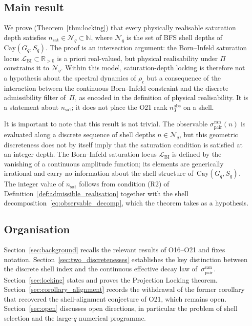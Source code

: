 \documentclass[12pt,a4paper]{article}
\theoremstyle{remark}
\newcommand{\sigpair}{\sigma^{\mathrm{can}}_{\mathrm{pair}}}
\newcommand{\nsat}{n_{\mathrm{sat}}}
\newcommand{\nobs}{n^{\mathrm{obs}}_3}
\newcommand{\Cay}{\mathrm{Cay}(G_q, S_q)}
\begin{document}
  \subsection{Main result}
    \label{subsec:main_result}

    We prove (Theorem~\ref{thm:locking}) that every physically realisable saturation depth
    satisfies $\nsat \in \mathcal{N}_q \subset \mathbb{N}$, where $\mathcal{N}_q$ is the set
    of BFS shell depths of $\Cay$.
    The proof is an intersection argument: the Born--Infeld saturation locus
    $\mathcal{L}_{\mathrm{BI}} \subset \mathbb{R}_{>0}$ is a priori real-valued, but physical
    realisability under $\Pi$ constrains it to $\mathcal{N}_q$.
    Within this model, saturation-depth locking is therefore not a hypothesis about the spectral
    dynamics of $\rho_c$ but a consequence of the interaction between the continuous
    Born--Infeld constraint and the discrete admissibility filter of~$\Pi$, as encoded in the
    definition of physical realisability.
    It is a statement about $\nsat$; it does not place the O21 rank $\nobs$ on a shell.

    It is important to note that this result is not trivial.
    The observable $\sigpair(n)$ is evaluated along a discrete sequence of shell depths
    $n \in \mathcal{N}_q$, but this geometric discreteness does not by itself imply that the
    saturation condition is satisfied at an integer depth.
    The Born--Infeld saturation locus $\mathcal{L}_{\mathrm{BI}}$ is defined by the vanishing
    of a continuous amplitude function; its elements are generically irrational and carry no
    information about the shell structure of~$\Cay$.
    The integer value of $\nsat$ follows from condition (R2) of
    Definition~\ref{def:admissible_realisation} together with the shell
    decomposition~\eqref{eq:observable_decomp}, which the theorem takes as a hypothesis.

  \subsection{Organisation}
    \label{subsec:organisation}

    Section~\ref{sec:background} recalls the relevant results of O16--O21 and fixes notation.
    Section~\ref{sec:two_discretenesses} establishes the key distinction between the discrete
    shell index and the continuous effective decay law of~$\sigpair$.
    Section~\ref{sec:locking} states and proves the Projection Locking theorem.
    Section~\ref{sec:corollary_alignment} records the withdrawal of the former corollary that
    recovered the shell-alignment conjecture of O21, which remains open.
    Section~\ref{sec:open} discusses open directions, in particular the problem of shell selection
    and the large-$q$ numerical programme.
\end{document}
